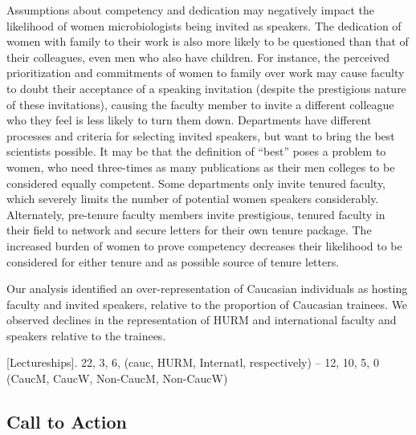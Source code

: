 \documentclass[10pt,]{article}
\begin{document}
Assumptions about competency and dedication may negatively impact the
likelihood of women microbiologists being invited as speakers. The
dedication of women with family to their work is also more likely to be
questioned than that of their colleagues, even men who also have
children. For instance, the perceived prioritization and commitments of
women to family over work may cause faculty to doubt their acceptance of
a speaking invitation (despite the prestigious nature of these
invitations), causing the faculty member to invite a different colleague
who they feel is less likely to turn them down. Departments have
different processes and criteria for selecting invited speakers, but
want to bring the best scientists possible. It may be that the
definition of ``best'' poses a problem to women, who need three-times as
many publications as their men colleges to be considered equally
competent. Some departments only invite tenured faculty, which severely
limits the number of potential women speakers considerably. Alternately,
pre-tenure faculty members invite prestigious, tenured faculty in their
field to network and secure letters for their own tenure package. The
increased burden of women to prove competency decreases their likelihood
to be considered for either tenure and as possible source of tenure
letters.

Our analysis identified an over-representation of Caucasian individuals
as hosting faculty and invited speakers, relative to the proportion of
Caucasian trainees. We observed declines in the representation of HURM
and international faculty and speakers relative to the trainees.

{[}Lectureships{]}. 22, 3, 6, (cauc, HURM, Internatl, respectively) --
12, 10, 5, 0 (CaucM, CaucW, Non-CaucM, Non-CaucW)

\subsection{Call to Action}\label{call-to-action}
\end{document}
